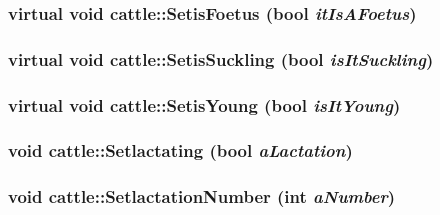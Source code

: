 \label{classcattle_a3277350bb7f701195d624d9ee10a2f5b}
\hypertarget{classcattle_a9040755a92eba6fcd6a71b907e06ef95}{
\subsubsection[{SetisFoetus}]{\setlength{\rightskip}{0pt plus 5cm}virtual void cattle::SetisFoetus (bool {\em itIsAFoetus})}}
\label{classcattle_a9040755a92eba6fcd6a71b907e06ef95}
\hypertarget{classcattle_a70296e4b60d7540a8be2be7beca964ca}{
\subsubsection[{SetisSuckling}]{\setlength{\rightskip}{0pt plus 5cm}virtual void cattle::SetisSuckling (bool {\em isItSuckling})}}
\label{classcattle_a70296e4b60d7540a8be2be7beca964ca}
\hypertarget{classcattle_a4c094d809f6ea65502d06a96dc42e08d}{
\subsubsection[{SetisYoung}]{\setlength{\rightskip}{0pt plus 5cm}virtual void cattle::SetisYoung (bool {\em isItYoung})}}
\label{classcattle_a4c094d809f6ea65502d06a96dc42e08d}
\hypertarget{classcattle_aec62f7edf9677935504583181c378966}{
\subsubsection[{Setlactating}]{\setlength{\rightskip}{0pt plus 5cm}void cattle::Setlactating (bool {\em aLactation})}}
\label{classcattle_aec62f7edf9677935504583181c378966}
\hypertarget{classcattle_aeed22677fe5975db88ee1788b5d27670}{
\subsubsection[{SetlactationNumber}]{\setlength{\rightskip}{0pt plus 5cm}void cattle::SetlactationNumber (int {\em aNumber})}}

